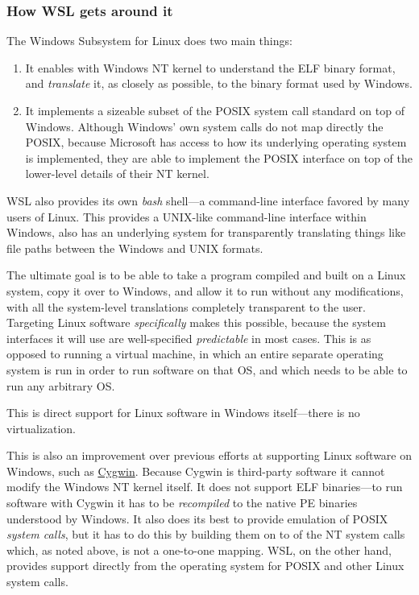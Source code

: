 \documentclass{deliverablereport}
\begin{document}
\subsubsection{How WSL gets around it}

The Windows Subsystem for Linux does two main things:

\begin{enumerate}
\item It enables with Windows NT kernel to understand the ELF binary
  format, and \emph{translate} it, as closely as possible, to the
  binary format used by Windows.
\item It implements a sizeable subset of the POSIX system call
  standard on top of Windows.  Although Windows' own system calls do
  not map directly the POSIX, because Microsoft has access to how its
  underlying operating system is implemented, they are able to
  implement the POSIX interface on top of the lower-level details of
  their NT kernel.
\end{enumerate}

WSL also provides its own \emph{bash} shell---a command-line interface
favored by many users of Linux.  This provides a UNIX-like
command-line interface within Windows, also has an underlying system
for transparently translating things like file paths between the
Windows and UNIX formats.

The ultimate goal is to be able to take a program compiled and built
on a Linux system, copy it over to Windows, and allow it to run
without any modifications, with all the system-level translations
completely transparent to the user.  Targeting Linux software
\emph{specifically} makes this possible, because the system interfaces
it will use are well-specified \emph{predictable} in most cases.  This
is as opposed to running a virtual machine, in which an entire
separate operating system is run in order to run software on that OS,
and which needs to be able to run any arbitrary OS.

This is direct support for Linux software in Windows itself---there is
no virtualization.

This is also an improvement over previous efforts at supporting Linux
software on Windows, such as \href{https://www.cygwin.com/}{Cygwin}.
Because Cygwin is third-party software it cannot modify the Windows NT
kernel itself.  It does not support ELF binaries---to run software
with Cygwin it has to be \emph{recompiled} to the native PE binaries
understood by Windows.  It also does its best to provide emulation of
POSIX \emph{system calls}, but it has to do this by building them on
to of the NT system calls which, as noted above, is not a one-to-one
mapping.  WSL, on the other hand, provides support directly from the
operating system for POSIX and other Linux system calls.
\end{document}
